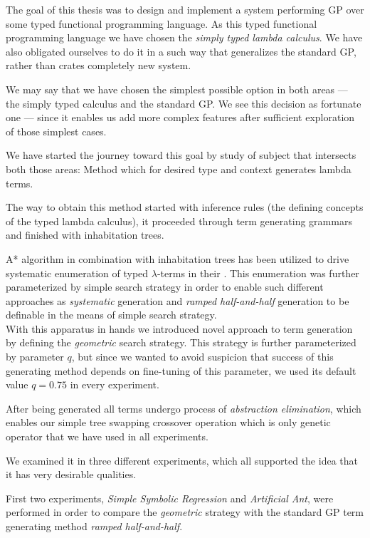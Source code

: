 \documentclass[12pt,a4paper]{report}
\newcommand{\lterms}{$\lambda$-terms\xspace}
\begin{document}
The goal of this thesis was to design and implement a system
performing GP over some typed functional programming language.
As this typed functional programming language we have chosen the 
\textit{simply typed lambda calculus}.
We have also obligated ourselves to do it in a such way that 
generalizes the standard GP, rather than
crates completely new system.

We may say that we have chosen the simplest possible
option in both areas --- the simply typed calculus and the standard GP.
We see this decision as fortunate one --- since it enables us add more
complex features after sufficient exploration of those simplest cases.
   
We have started the journey toward this goal by study 
of subject that intersects both those areas:
Method which for desired type and context generates lambda terms.  

The way to obtain this method started with inference rules 
(the defining concepts of the typed lambda calculus),
it proceeded through term generating grammars and finished 
with inhabitation trees.

A* algorithm in combination with inhabitation trees
has been utilized to drive systematic enumeration
of typed \lterms in their \lnf. This enumeration was further 
parameterized by simple search strategy in order to enable
such different approaches as \textit{systematic} generation 
and \textit{ramped half-and-half} generation to be definable
in the means of simple search strategy.\\

With this apparatus in hands we introduced novel approach
to term generation by defining the \textit{geometric} search 
strategy. This strategy is further parameterized by parameter
$q$,  but since we wanted to avoid suspicion that success
of this generating method depends on fine-tuning of this
parameter, we used its default value $q = 0.75$ in every experiment.

After being generated all terms undergo process of \textit{abstraction
elimination}, which enables our simple tree swapping crossover operation
which is only genetic operator that we have used in all experiments.

We examined it in three different experiments, which all 
supported the idea that it has very desirable qualities.

First two experiments, \textit{Simple Symbolic Regression} and 
\textit{Artificial Ant}, were performed in order to compare
the \textit{geometric} strategy with the standard GP term 
generating method \textit{ramped half-and-half}. 
\end{document}

